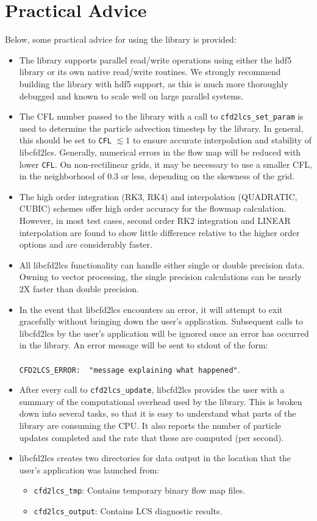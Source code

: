 \documentclass[letterpaper,11pt]{article}
\begin{document}
\section{Practical Advice}
Below, some practical advice for using the library is provided:
\begin{itemize}
 \item The library supports parallel read/write operations using either the hdf5 library or its own native read/write routines. We strongly recommend building the library with hdf5 support, as this is much more thoroughly debugged and known to scale well on large parallel systems.
 \item The CFL number passed to the library with a call to \verb|cfd2lcs_set_param| is used to determine the particle advection timestep by the library.  In general, this should be set to \verb|CFL| $\lesssim 1$ to ensure accurate interpolation and stability of libcfd2lcs.  Generally, numerical errors in the flow map will be reduced with lower \verb|CFL|.  On non-rectilinear grids, it may be necessary to use a smaller CFL, in the neighborhood of 0.3 or less, depending on the skewness of the grid.
\item The high order integration (RK3, RK4) and interpolation (QUADRATIC, CUBIC) schemes offer high order accuracy for the flowmap calculation.  However, in most test cases, second order RK2 integration and LINEAR interpolation are found to show little difference relative to the higher order options and are considerably faster.
\item All libcfd2lcs functionality can handle either single or double precision data.  Owning to vector processing, the single precision calculations can be nearly 2X faster than double precision.
\item In the event that libcfd2lcs encounters an error, it will attempt to exit gracefully without bringing down the user's application. Subsequent calls to libcfd2lcs by the user's application will be ignored once an error has occurred in the library.  An error message will be sent to stdout of the form:\\  \\ \verb|CFD2LCS_ERROR:  "message explaining what happened"|.\\ 
\item After every call to \verb|cfd2lcs_update|, libcfd2lcs provides the user with a summary of the computational overhead used by the library.  This is broken down into several tasks, so that it is easy to understand what parts of the library are consuming the CPU.  It also reports the number of particle updates completed and the rate that these are computed (per second).
\item libcfd2lcs creates two directories for data output in the location that the user's application was launched from:
\begin{itemize}
 \item \verb|cfd2lcs_tmp|:   Contains temporary binary flow map files.
 \item \verb|cfd2lcs_output|:   Contains LCS diagnostic results.
\end{itemize}
\end{itemize}
\end{document}
